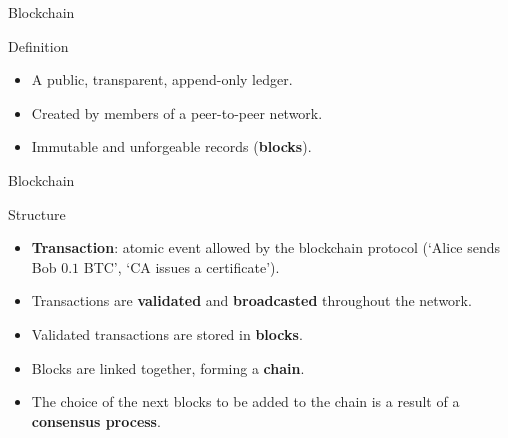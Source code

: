 \begin{frame}{Blockchain}

\begin{exampleblock}{Definition}
\begin{itemize}
\item A public, transparent,
append-only ledger.
\item Created by members of a peer-to-peer
network.
\item Immutable and unforgeable records (\textbf{blocks}).
\end{itemize}
\end{exampleblock}

\end{frame}



\begin{frame}{Blockchain}

\begin{exampleblock}{Structure}
\begin{itemize}
\item \textbf{Transaction}: atomic event
allowed by the blockchain protocol (`Alice sends Bob $0.1$ BTC', `CA issues a certificate').
\item Transactions are \textbf{validated} and \textbf{broadcasted}
throughout the network.
\item Validated transactions are
stored in \textbf{blocks}.
\item Blocks are linked together,
forming a \textbf{chain}.
\item The choice of the next blocks to be
added to the chain is a result of a \textbf{consensus process}.
\end{itemize}
\end{exampleblock}

\end{frame}


